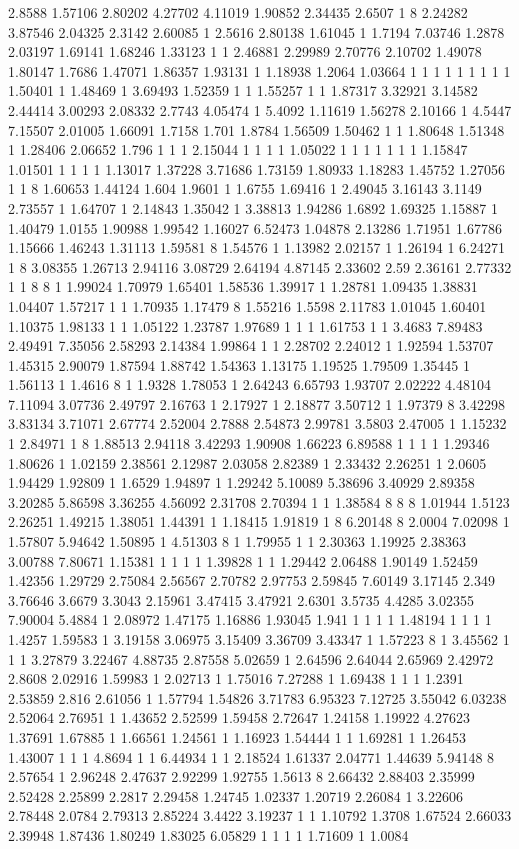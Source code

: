 2.8588 1.57106 2.80202 4.27702 4.11019 1.90852 2.34435 2.6507 1 8 2.24282 3.87546 2.04325 2.3142 2.60085 1 2.5616 2.80138 1.61045 1 1.7194 7.03746 1.2878 2.03197 1.69141 1.68246 1.33123 1 1 2.46881 2.29989 2.70776 2.10702 1.49078 1.80147 1.7686 1.47071 1.86357 1.93131 1 1.18938 1.2064 1.03664 1 1 1 1 1 1 1 1 1 1.50401 1 1.48469 1 3.69493 1.52359 1 1 1.55257 1 1 1.87317 3.32921 3.14582 2.44414 3.00293 2.08332 2.7743 4.05474 1 5.4092 1.11619 1.56278 2.10166 1 4.5447 7.15507 2.01005 1.66091 1.7158 1.701 1.8784 1.56509 1.50462 1 1 1.80648 1.51348 1 1.28406 2.06652 1.796 1 1 1 2.15044 1 1 1 1 1.05022 1 1 1 1 1 1 1 1.15847 1.01501 1 1 1 1 1.13017 1.37228 3.71686 1.73159 1.80933 1.18283 1.45752 1.27056 1 1 8 1.60653 1.44124 1.604 1.9601 1 1.6755 1.69416 1 2.49045 3.16143 3.1149 2.73557 1 1.64707 1 2.14843 1.35042 1 3.38813 1.94286 1.6892 1.69325 1.15887 1 1.40479 1.0155 1.90988 1.99542 1.16027 6.52473 1.04878 2.13286 1.71951 1.67786 1.15666 1.46243 1.31113 1.59581 8 1.54576 1 1.13982 2.02157 1 1.26194 1 6.24271 1 8 3.08355 1.26713 2.94116 3.08729 2.64194 4.87145 2.33602 2.59 2.36161 2.77332 1 1 8 8 1 1.99024 1.70979 1.65401 1.58536 1.39917 1 1.28781 1.09435 1.38831 1.04407 1.57217 1 1 1.70935 1.17479 8 1.55216 1.5598 2.11783 1.01045 1.60401 1.10375 1.98133 1 1 1.05122 1.23787 1.97689 1 1 1 1.61753 1 1 3.4683 7.89483 2.49491 7.35056 2.58293 2.14384 1.99864 1 1 2.28702 2.24012 1 1.92594 1.53707 1.45315 2.90079 1.87594 1.88742 1.54363 1.13175 1.19525 1.79509 1.35445 1 1.56113 1 1.4616 8 1 1.9328 1.78053 1 2.64243 6.65793 1.93707 2.02222 4.48104 7.11094 3.07736 2.49797 2.16763 1 2.17927 1 2.18877 3.50712 1 1.97379 8 3.42298 3.83134 3.71071 2.67774 2.52004 2.7888 2.54873 2.99781 3.5803 2.47005 1 1.15232 1 2.84971 1 8 1.88513 2.94118 3.42293 1.90908 1.66223 6.89588 1 1 1 1 1.29346 1.80626 1 1.02159 2.38561 2.12987 2.03058 2.82389 1 2.33432 2.26251 1 2.0605 1.94429 1.92809 1 1.6529 1.94897 1 1.29242 5.10089 5.38696 3.40929 2.89358 3.20285 5.86598 3.36255 4.56092 2.31708 2.70394 1 1 1.38584 8 8 8 1.01944 1.5123 2.26251 1.49215 1.38051 1.44391 1 1.18415 1.91819 1 8 6.20148 8 2.0004 7.02098 1 1.57807 5.94642 1.50895 1 4.51303 8 1 1.79955 1 1 2.30363 1.19925 2.38363 3.00788 7.80671 1.15381 1 1 1 1 1.39828 1 1 1.29442 2.06488 1.90149 1.52459 1.42356 1.29729 2.75084 2.56567 2.70782 2.97753 2.59845 7.60149 3.17145 2.349 3.76646 3.6679 3.3043 2.15961 3.47415 3.47921 2.6301 3.5735 4.4285 3.02355 7.90004 5.4884 1 2.08972 1.47175 1.16886 1.93045 1.941 1 1 1 1 1.48194 1 1 1 1 1.4257 1.59583 1 3.19158 3.06975 3.15409 3.36709 3.43347 1 1.57223 8 1 3.45562 1 1 1 3.27879 3.22467 4.88735 2.87558 5.02659 1 2.64596 2.64044 2.65969 2.42972 2.8608 2.02916 1.59983 1 2.02713 1 1.75016 7.27288 1 1.69438 1 1 1 1.2391 2.53859 2.816 2.61056 1 1.57794 1.54826 3.71783 6.95323 7.12725 3.55042 6.03238 2.52064 2.76951 1 1.43652 2.52599 1.59458 2.72647 1.24158 1.19922 4.27623 1.37691 1.67885 1 1.66561 1.24561 1 1.16923 1.54444 1 1 1.69281 1 1.26453 1.43007 1 1 1 4.8694 1 1 6.44934 1 1 2.18524 1.61337 2.04771 1.44639 5.94148 8 2.57654 1 2.96248 2.47637 2.92299 1.92755 1.5613 8 2.66432 2.88403 2.35999 2.52428 2.25899 2.2817 2.29458 1.24745 1.02337 1.20719 2.26084 1 3.22606 2.78448 2.0784 2.79313 2.85224 3.4422 3.19237 1 1 1.10792 1.3708 1.67524 2.66033 2.39948 1.87436 1.80249 1.83025 6.05829 1 1 1 1 1.71609 1 1.0084 